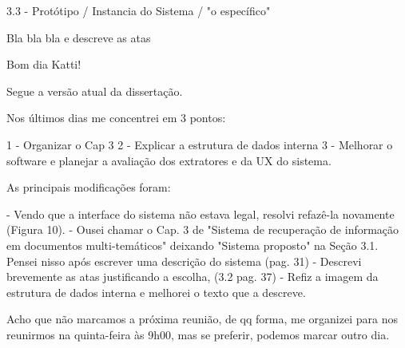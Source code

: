 3.3 - Protótipo / Instancia do Sistema / "o específico"

Bla bla bla e descreve as atas








Bom dia Katti! 

Segue a versão atual da dissertação. 


Nos últimos dias me concentrei em 3 pontos:

1 - Organizar o Cap 3 
2 - Explicar a estrutura de dados interna
3 - Melhorar o software e planejar a avaliação dos extratores e da UX do sistema.

As principais modificações foram:

- Vendo que a interface do sistema não estava legal, resolvi refazê-la novamente (Figura 10).
- Ousei chamar o Cap. 3 de "Sistema de recuperação de informação em documentos multi-temáticos" deixando "Sistema proposto" na Seção 3.1. Pensei nisso após escrever uma descrição do sistema (pag. 31)
- Descrevi brevemente as atas justificando a escolha, (3.2 pag. 37)
- Refiz a imagem da estrutura de dados interna e melhorei o texto que a descreve.

Acho que não marcamos a próxima reunião, de qq forma, me organizei para nos reunirmos na quinta-feira às 9h00, mas se preferir, podemos marcar outro dia.














